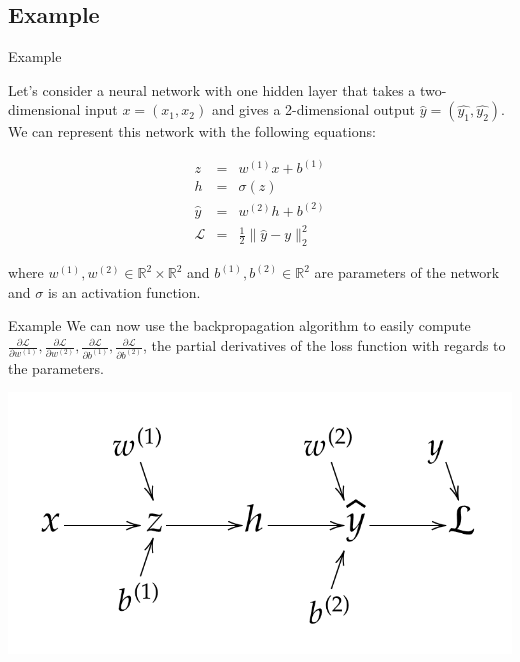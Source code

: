 \documentclass[11pt]{beamer}
\begin{document}
\subsection{Example}
\begin{frame}{Example}

Let's consider a neural network with one hidden layer that takes a two-dimensional input $x = (x_1, x_2)$ and gives a 2-dimensional output $\hat{y} = (\hat{y_1},\hat{y_2})$. We can represent this network with the following equations:

\begin{eqnarray*}
z & = & w^{(1)}x + b^{(1)} \\ 
h & = & \sigma (z)\\
\hat{y} & = &  w^{(2)}h + b^{(2)} \\
\mathcal{L} & = & \frac{1}{2} \| \hat{y} - y \|_2^2
\end{eqnarray*}
   
where $w^{(1)}, w^{(2)} \in \mathbb{R}^2\times \mathbb{R}^2$ and $b^{(1)}, b^{(2)} \in \mathbb{R}^2$ are parameters of the network and $\sigma$ is an activation function.

\end{frame}

\begin{frame}{Example}
We can now use the backpropagation algorithm to easily compute $\frac{\partial \mathcal{L}}{\partial w^{(1)}}, \frac{\partial \mathcal{L}}{\partial w^{(2)}},\frac{\partial \mathcal{L}}{\partial b^{(1)}},\frac{\partial \mathcal{L}}{\partial b^{(2)}}$, the partial derivatives of the loss function with regards to the parameters.

\center
\includegraphics[scale=0.5]{computation_graph.png}
\end{frame}
\end{document}
